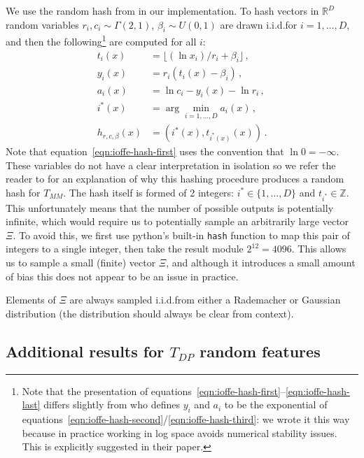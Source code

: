 We use the random hash from \citet{ioffe2010improved} in our implementation.
To hash vectors in $\mathbb{R}^D$
random variables
$r_i, c_i\sim \Gamma(2, 1)$, $\beta_i\sim U(0, 1)$
are drawn i.i.d.\@ for $i=1,\ldots,D$,
and then the following\footnote{
Note that the presentation of equations~\ref{eqn:ioffe-hash-first}--\ref{eqn:ioffe-hash-last}
differs slightly from \citet{ioffe2010improved} who defines $y_i$ and $a_i$ to be the exponential
of equations~\ref{eqn:ioffe-hash-second}/\ref{eqn:ioffe-hash-third}: we wrote it this way because in practice
working in log space avoids numerical stability issues.
This is explicitly suggested in their paper.
}
are computed for all $i$:
\begin{align}
    t_i(x) &= \lfloor (\ln{x_i})/r_i + \beta_i \rfloor \label{eqn:ioffe-hash-first}\,, \\
    y_i(x) &= r_i(t_i(x)-\beta_i) \label{eqn:ioffe-hash-second}\,, \\
    a_i(x) &= \ln{c_i} - y_i(x) - \ln{r_i} \label{eqn:ioffe-hash-third}\,, \\
    i^*(x) &= \arg\min_{i=1,\ldots,D} a_i(x)\,,  \\
    h_{r,c,\beta}(x) &= \left(i^*(x), t_{i^*(x)}(x)\right) \,.\label{eqn:ioffe-hash-last}
\end{align}
Note that equation~\ref{eqn:ioffe-hash-first} uses the convention that $\ln{0}=-\infty$.
These variables do not have a clear interpretation in isolation so we refer the reader
to \citet{ioffe2010improved} for an explanation of why this hashing procedure
produces a random hash for $T_{MM}$.
The hash itself is formed of 2 integers: $i^*\in\{1,\ldots,D\}$
and $t_{i^*}\in\mathbb{Z}$.
This unfortunately means that the number of possible outputs is potentially infinite,
which would require us to potentially sample an arbitrarily large vector $\Xi$.
To avoid this, we first use python's built-in \texttt{hash} function to map this pair of integers to a single integer,
then take the result module $2^{12}=4096$.
This allows us to sample a small (finite) vector $\Xi$,
and although it introduces a small amount of bias this does not appear to be an issue in practice.

Elements of $\Xi$ are always sampled i.i.d.\@ from either a Rademacher or Gaussian distribution
(the distribution should always be clear from context).


\subsection{Additional results for $T_{DP}$ random features}

